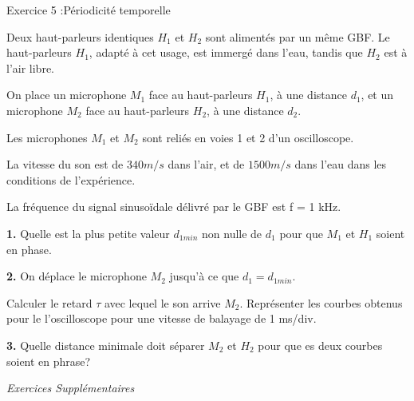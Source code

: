 \documentclass[12pt, french]{article}
\begin{document}
\begin{Box2}{Exercice 5 :Périodicité temporelle }

Deux haut-parleurs identiques $H_1$ et $H_2$ sont alimentés par un même GBF. 
Le haut-parleurs $H_1$, adapté à cet usage, est immergé dans l'eau, tandis que $H_2$ est à l'air libre. 

On place un microphone $M_1$ face au haut-parleurs $H_1$, à une distance $d_1$, et un microphone $M_2$ face au haut-parleurs $H_2$, à une distance $d_2$. 

Les microphones $M_1$ et $M_2$ sont reliés en voies 1 et 2 d'un oscilloscope.

La vitesse du son est de $340 m/s$ dans l'air, et de $1500 m/s$ dans l'eau dans les conditions de l'expérience.

La fréquence du signal sinusoïdale délivré par le GBF est f = 1 kHz.

\textbf{1. }Quelle est la plus petite valeur $d_{1min}$ non nulle de $d_1$ pour que $M_1$ et $H_1$ soient en phase.

\textbf{2. }On déplace le microphone $M_2$ jusqu'à ce que $d_1=d_{1min}$. 

Calculer le retard $\tau$ avec lequel le son arrive $M_2$. Représenter les courbes obtenus pour le l'oscilloscope pour une vitesse de balayage de 1 ms/div.

\textbf{3. }Quelle distance minimale doit séparer $M_2$ et $H_2$ pour que es deux courbes soient en phrase?

\end{Box2}
\begin{center}
   \Large{ \em{Exercices Supplémentaires}}
\end{center}
\end{document}
